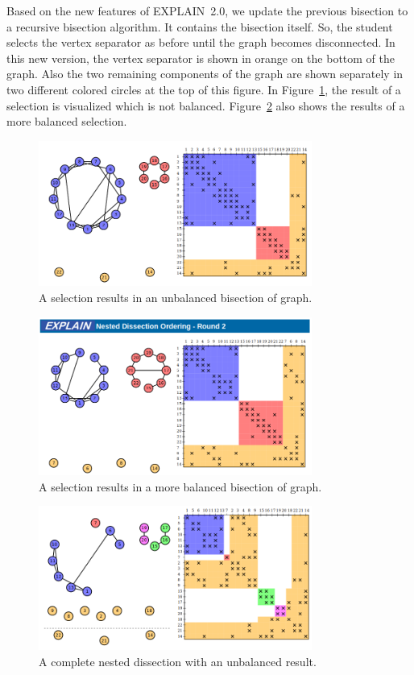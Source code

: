 \documentclass[12pt, twoside,a4paper,toc=bibliography]{scrbook}
\begin{document}
Based on the new features of \mbox{EXPLAIN 2.0}, we update the previous
bisection to a recursive bisection algorithm.
It contains the bisection itself. So, the student selects the vertex separator
as before until the graph becomes disconnected.
In this new version, the vertex separator is shown in orange on the bottom
of the graph. Also the two remaining components of the graph are shown separately
in two different colored circles at the top of this figure.
In Figure~\ref{bad_bisection}, the result of a selection is visualized which
is not balanced.
Figure~\ref{good_bisection} also shows the results of a more balanced selection.

\begin{figure}
\centering
\includegraphics[width=0.8\textwidth]{bad_bisection}
\caption{A selection results in an unbalanced bisection of graph.}
\label{bad_bisection}
\end{figure}

\begin{figure}
\centering
\includegraphics[width=0.8\textwidth]{good_bisection}
\caption{A selection results in a more balanced bisection of graph.}
\label{good_bisection}
\end{figure}

\begin{figure}
\centering
\includegraphics[width=0.8\textwidth]{bad_disection}
\caption{A complete nested dissection with an unbalanced result.}
\label{bad_disection}
\end{figure}
\end{document}
